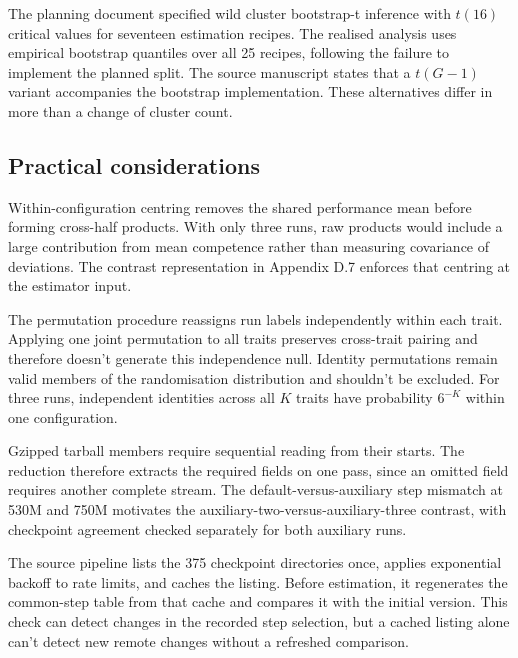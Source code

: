The planning document specified wild cluster bootstrap-t inference with $t(16)$ critical values for seventeen estimation recipes. The realised analysis uses empirical bootstrap quantiles over all 25 recipes, following the failure to implement the planned split. The source manuscript states that a $t(G-1)$ variant accompanies the bootstrap implementation. These alternatives differ in more than a change of cluster count.

\subsection{Practical considerations}
Within-configuration centring removes the shared performance mean before forming cross-half products. With only three runs, raw products would include a large contribution from mean competence rather than measuring covariance of deviations. The contrast representation in Appendix D.7 enforces that centring at the estimator input.

The permutation procedure reassigns run labels independently within each trait. Applying one joint permutation to all traits preserves cross-trait pairing and therefore doesn't generate this independence null. Identity permutations remain valid members of the randomisation distribution and shouldn't be excluded. For three runs, independent identities across all $K$ traits have probability $6^{-K}$ within one configuration.

Gzipped tarball members require sequential reading from their starts. The reduction therefore extracts the required fields on one pass, since an omitted field requires another complete stream. The default-versus-auxiliary step mismatch at 530M and 750M motivates the auxiliary-two-versus-auxiliary-three contrast, with checkpoint agreement checked separately for both auxiliary runs.

The source pipeline lists the 375 checkpoint directories once, applies exponential backoff to rate limits, and caches the listing. Before estimation, it regenerates the common-step table from that cache and compares it with the initial version. This check can detect changes in the recorded step selection, but a cached listing alone can't detect new remote changes without a refreshed comparison.


